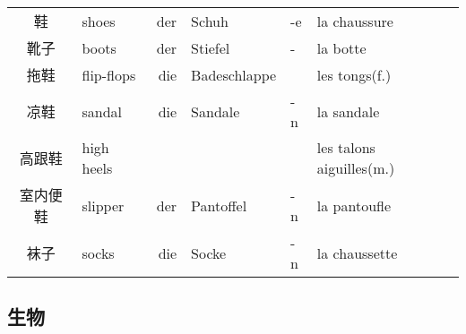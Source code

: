 \documentclass[12pt,A4paper,oneside,reqno]{amsart}
\numberwithin{equation}{section}
\theoremstyle{plain}
\theoremstyle{plain}
\theoremstyle{plain}
\numberwithin{equation}{section}
\theoremstyle{remark}
\begin{document}
\begin{longtable}{c|l|rll|l}
鞋	&	shoes	&	der	&	Schuh	&	-e	&	la chaussure	\\
靴子	&	boots	&	der	&	Stiefel	&	-	&	la botte	\\
拖鞋	&	flip-flops	&	die	&	Badeschlappe	&		&	les tongs(f.)	\\
凉鞋	&	sandal	&	die	&	Sandale	&	-n	&	la sandale	\\
高跟鞋	&	high heels	&		&		&		&	les talons aiguilles(m.)	\\
室内便鞋	&	slipper	&	der	&	Pantoffel	&	-n	&	la pantoufle	\\
袜子	&	socks	&	die	&	Socke	&	-n	&	la chaussette	\\

	
	
\end{longtable}
\subsection{生物}\hspace{1cm}
\end{document}
